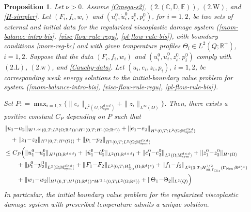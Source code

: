 \documentclass[a4paper,10pt,reqno]{amsart}
\numberwithin{equation}{section}
\newcommand{\bbM}{\mathbb{M}}
\newcommand{\R}{\mathbb{R}}
\numberwithin{equation}{section}
\newtheorem{proposition}[theorem]{Proposition}
\newcommand{\Dir}{\mathrm{Dir}}
\newcommand{\Neu}{\mathrm{Neu}}
\newcommand{\bbC}{\mathbb{C}}
\newcommand{\bbD}{\mathbb{D}}
\newcommand{\bbE}{\mathbb{E}}
\newcommand{\mt}{\bbM}
\newcommand{\sym}{\mathrm{sym}}
\newcommand{\Gdir}{\Gamma_{\Dir}}
\newcommand{\Gneu}{\Gamma_{\Neu}}
\newcommand{\spz}{H^{\mathrm{s}}(\Omega)}
\newcommand{\EEE}{\color{black}}
\newcommand{\MMM}{\color{black}}%
\begin{document}
  \begin{proposition}
  \label{prop:continuous-dependence}
  Let $\nu>0$.
Assume
\eqref{Omega-s2},
$(2.(\bbC,\bbD,\bbE))$, 
 $(2.\mathrm{W})$,  and \eqref{H-simpler}.  
 Let $(F_i,f_i,w_i)$  and $(u_i^0, \dot{u}_i^0, z_i^0, p_i^0)$, for $i=1,2$,  be two sets of external and initial data for the regularized viscoplastic damage system
  (\ref{mom-balance-intro-bis}, \ref{visc-flow-rule-regu}, \ref{pl-flow-rule-bis}), with boundary conditions
  \eqref{more-reg-bc}
  and 
  with  given temperature profiles $\Theta_i \in L^2(Q;\R^+)$, $i=1,2$. Suppose that
  the data  $(F_i,f_i,w_i)$  and $(u_i^0, \dot{u}_i^0, z_i^0, p_i^0)$ comply with 
  $(2.\mathrm{L})$, $(2.\mathrm{w})$, and \eqref{Cauchy-data}.
  Let $(u_i,e_i,z_i,p_i)$, $i=1,2$,  be corresponding weak energy  solutions to the initial-boundary value problem for system 
   (\ref{mom-balance-intro-bis}, \ref{visc-flow-rule-regu}, \ref{pl-flow-rule-bis}).
  \par
  Set  \MMM $P: = \max_{i=1,2}\{ \|e_i\|_{L^2(\Omega;\mt_\sym^{d\times d})} + \|z_i\|_{L^\infty(\Omega)}   \}.$
Then, there exists a positive constant $C_P$  depending on $P$ \EEE %
 such that 
  \begin{equation}
  \label{cont-dependence-estimate}
\begin{aligned}
&
\| u_1{-}u_2\|_{W^{1,\infty}(0,T;L^2(\Omega;\R^d)) \cap H^1(0,T;H^1(\Omega;\R^d))} + \|e_1{-}e_2\|_{H^1(0,T;L^2(\Omega;\mt_\sym^{d\times d})} 
\\
& \quad 
 + \|z_1{-}z_2\|_{H^1(0,T;\spz)}
   + \|p_1{-}p_2\|_{H^1(0,T;L^2(\Omega;\mt_\sym^{d\times d})}
   \\
   & \leq \MMM C_P \EEE  \Big( \| u_1^0{-} u_2^0\|_{H^1(\Omega;\R^{d\times d})} + \| \dot{u}_1^0{-} \dot{u}_2^0\|_{L^2(\Omega;\R^{d\times d})}
   + \| e_1^0{-} e_2^0\|_{L^2(\Omega;\mt_\sym^{d\times d})} 
   + \|z_1^0 {-} z_2^0 \|_{\spz} 
   \\
   & \quad \quad 
   + \| p_1^0{-} p_2^0\|_{L^2(\Omega;\mt_\sym^{d\times d})}
   + \|F_1{-}F_2\|_{L^2(0,T;H_\Dir^1(\Omega;\R^d)^*)} +  \|f_1{-}f_2\|_{L^2(0,T;H_{00,\Gdir}^{1/2}(\Gneu;\R^d)^*)}
   \\
   &
   \quad  \quad 
    + \|w_1{-}w_2\|_{H^1(0,T;H^1(\Omega;\R^d)) \cap W^{2,1}(0,T;L^2(\Omega;\R^d))}
   + \|\Theta_1{-}\Theta_2 \|_{L^2(Q)} 
   \Big) 
\end{aligned}
\end{equation} 
In particular, the initial boundary value problem for the regularized viscoplastic damage   system \MMM with prescribed temperature \EEE admits a unique solution. 
  \end{proposition}
\end{document}
